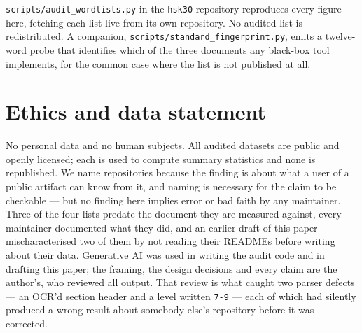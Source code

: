 \documentclass[11pt]{article}
\begin{document}
\texttt{scripts/audit\_wordlists.py} in the \texttt{hsk30} repository reproduces
every figure here, fetching each list live from its own repository. No audited
list is redistributed. A companion,
\texttt{scripts/standard\_fingerprint.py}, emits a twelve-word probe that
identifies which of the three documents any black-box tool implements, for the
common case where the list is not published at all.

\section*{Ethics and data statement}

No personal data and no human subjects. All audited datasets are public and
openly licensed; each is used to compute summary statistics and none is
republished. We name repositories because the finding is about what a user of a
public artifact can know from it, and naming is necessary for the claim to be
checkable --- but no finding here implies error or bad faith by any maintainer.
Three of the four lists predate the document they are measured against, every
maintainer documented what they did, and an earlier draft of this paper
mischaracterised two of them by not reading their READMEs before writing about
their data.
Generative AI was used in writing the audit code and in drafting this paper; the
framing, the design decisions and every claim are the author's, who reviewed all
output. That review is what caught two parser defects --- an OCR'd section header
and a level written \texttt{7-9} --- each of which had silently produced a wrong
result about somebody else's repository before it was corrected.


\end{document}
